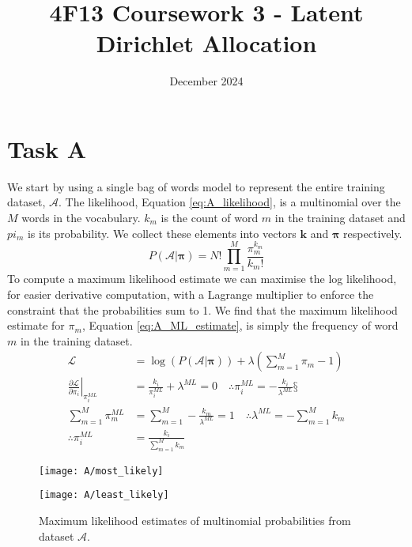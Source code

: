 \documentclass[11pt]{article}
\title{\vspace{-2cm}4F13 Coursework 3 - Latent Dirichlet Allocation}
\author{}
\date{December 2024}
\begin{document}


\setcounter{page}{1}

\maketitle

\section{Task A}

We start by using a single bag of words model to represent the entire training dataset, $\mathcal{A}$. The likelihood, Equation \ref{eq:A_likelihood}, is a multinomial over the $M$ words in the vocabulary. $k_m$ is the count of word $m$ in the training dataset and $pi_m$ is its probability. We collect these elements into vectors $\boldsymbol{k}$ and $\boldsymbol{\pi}$ respectively.
\begin{equation}
    P(\mathcal{A} | \boldsymbol{\pi}) = N! \prod_{m=1}^{M} \frac{\pi_m^{k_m}}{k_m!}
    \label{eq:A_likelihood}
\end{equation}
To compute a maximum likelihood estimate we can maximise the log likelihood, for easier derivative computation, with a Lagrange multiplier to enforce the constraint that the probabilities sum to 1. We find that the maximum likelihood estimate for $\pi_m$, Equation \ref{eq:A_ML_estimate}, is simply the frequency of word $m$ in the training dataset.
\begin{equation}
    \begin{aligned}
        \mathcal{L} &= \log(P(\mathcal{A} | \boldsymbol{\pi})) + \lambda (\sum_{m=1}^{M} \pi_m - 1) \\
        \left . \frac{\partial \mathcal{L}}{\partial \pi_i} \right \rvert_{\pi_i^{ML}} &= \frac{k_i}{\pi_i^{ML}} + \lambda^{ML} = 0 \quad \therefore \pi_i^{ML} = - \frac{k_i}{\lambda^{ML}}§ \\
        \sum_{m=1}^{M} \pi_m^{ML} &= \sum_{m=1}^{M} -\frac{k_m}{\lambda^{ML}} = 1 \quad \therefore \lambda^{ML} = -\sum_{m=1}^{M} k_m \\
        \therefore \pi_i^{ML} &= \frac{k_i}{\sum_{m=1}^{M} k_m}
    \end{aligned}
    \label{eq:A_ML_estimate}
\end{equation}

\begin{figure}
    \centering
    \begin{minipage}{0.49\textwidth}
        \centering
        \texttt{[image: A/most\_likely]}
        \label{fig:A_most_likely_words}
    \end{minipage}
    \begin{minipage}{0.49\textwidth}
        \centering
        \texttt{[image: A/least\_likely]}
        \label{fig:A_least_likely_words}
    \end{minipage}
    \caption{Maximum likelihood estimates of multinomial probabilities from dataset $\mathcal{A}$.}
    \label{fig:A_ML_estimates}
\end{figure}
\end{document}
